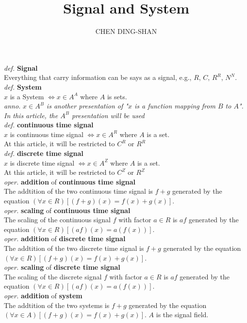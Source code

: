 \documentclass{article}
\title{Signal and System}
\author{CHEN DING-SHAN}
\date{}
\newcommand{\sd}[1]{{\left(#1\right)}}
\newcommand{\df}[1]{\emph{def.} \textbf{#1}}
\newcommand{\anno}[1]{\emph{anno.} \emph{#1}}
\newcommand{\md}[1]{{\left[#1\right]}}
\newcommand{\oper}[2]{\emph{oper.} \textbf{#1} of \textbf{#2}}
\begin{document}
\maketitle
\noindent
\df{Signal}\\
Everything that carry information can be says as a signal, e.g., $R$, $C$, $R^R$, $N^N$.\\
\df{System}\\
$x$ is a System $\iff x \in A^A$ where $A$ is sets.\\
\anno{$x \in A^B$ is another presentation of "$x$ is a function mapping from $B$ to $A$". In this article, the $A^B$ presentation will be used}\\
\df{continuous time signal}\\
$x$ is continuous time signal $\iff x \in A^R$ where $A$ is a set.\\
At this article, it will be restricted to $C^R$ or $R^R$\\
\df{discrete time signal}\\
$x$ is discrete time signal $\iff x \in A^Z$ where $A$ is a set.\\
At this article, it will be restricted to $C^Z$ or $R^Z$\\
\oper{addition}{continuous time signal}\\
The addtition of the two continuous time signal is $f+g$ generated by the equation $\sd{\forall x \in R}\md{\sd{f+g}\sd{x} = f\sd{x} + g\sd{x}}$.\\
\oper{scaling}{continuous time signal}\\
The scaling of the continuous signal $f$ with factor $a \in R$ is $af$ generated by the equation $\sd{\forall x \in R}\md{\sd{af}\sd{x} = a\sd{f\sd{x}}}$.\\
\oper{addition}{discrete time signal}\\
The addtition of the two discrete time signal is $f+g$ generated by the equation $\sd{\forall x \in R}\md{\sd{f+g}\sd{x} = f\sd{x} + g\sd{x}}$.\\
\oper{scaling}{discrete time signal}\\
The scaling of the discrete signal $f$ with factor $a \in R$ is $af$ generated by the equation $\sd{\forall x \in R}\md{\sd{af}\sd{x} = a\sd{f\sd{x}}}$.\\
\oper{addition}{system}\\
The addtition of the two systems is $f+g$ generated by the equation $\sd{\forall x \in A}\md{\sd{f+g}\sd{x} = f\sd{x} + g\sd{x}}$. $A$ is the signal field.\\
\end{document}
